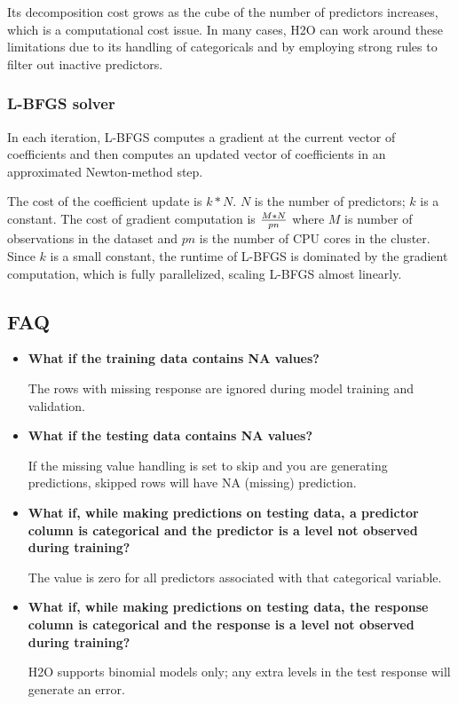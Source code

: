 Its decomposition
cost grows as the cube of the number of predictors increases, which is a computational cost issue. In many cases, H2O can work around these limitations due to its handling of categoricals and by employing strong rules to filter out inactive predictors.

\subsubsection{L-BFGS solver}
In each iteration, L-BFGS computes a gradient at the current vector of coefficients and then computes an updated vector of coefficients in an approximated Newton-method step. 

The cost of the coefficient update is $k*N$. $N$ is the number of predictors; $k$ is a constant. The cost of gradient computation is $M*N\over pn$ where $M$ is number of observations in the dataset and $pn$ is the number of CPU cores in the cluster. Since $k$ is a small constant, the runtime of L-BFGS is dominated by the gradient computation, which is fully parallelized, scaling L-BFGS almost linearly. 

\subsection{FAQ}

\begin{itemize}
\item \textbf{What if the training data contains NA values?}

 The rows with missing response are ignored during model training and validation.

\item \textbf{What if the testing data contains NA values?}

 If the missing value handling is set to skip and you are generating predictions, skipped rows will have NA (missing) prediction.

\item \textbf{What if, while making predictions on testing data, a predictor column is categorical and the predictor is a level not observed during training?}

 The value is zero for all predictors associated with that categorical variable.

\item \textbf{What if, while making predictions on testing data, the response column is categorical and the response is a level not observed during training?} 

H2O supports binomial models only; any extra levels in the test response will generate an error.
\end{itemize}

